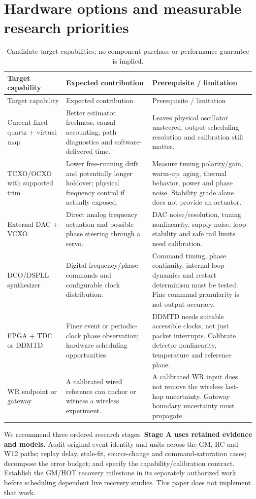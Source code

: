 \documentclass[11pt,letterpaper]{article}
\begin{document}
\section{Hardware options and measurable research priorities}
\small
\begin{longtable}{L{3.0cm}L{5.5cm}L{6.05cm}}
\caption{Candidate target capabilities; no component purchase or performance guarantee is implied.}\\
\toprule Target capability & Expected contribution & Prerequisite / limitation \\
\midrule\endfirsthead
\toprule Target capability & Expected contribution & Prerequisite / limitation \\
\midrule\endhead
Current fixed quartz + virtual map & Better estimator freshness, causal accounting, path diagnostics and software-delivered time. & Leaves physical oscillator unsteered; output scheduling resolution and calibration still matter. \\
TCXO/OCXO with supported trim & Lower free-running drift and potentially longer holdover; physical frequency control if actually exposed. & Measure tuning polarity/gain, warm-up, aging, thermal behavior, power and phase noise. Stability grade alone does not provide an actuator. \\
External DAC + VCXO & Direct analog frequency actuation and possible phase steering through a servo. & DAC noise/resolution, tuning nonlinearity, supply noise, loop stability and safe rail limits need calibration. \\
DCO/DSPLL synthesizer & Digital frequency/phase commands and configurable clock distribution. & Command timing, phase continuity, internal loop dynamics and restart determinism must be tested. Fine command granularity is not output accuracy. \\
FPGA + TDC or DDMTD & Finer event or periodic-clock phase observation; hardware scheduling opportunities. & DDMTD needs suitable accessible clocks, not just packet interrupts. Calibrate detector nonlinearity, temperature and reference plane. \\
WR endpoint or gateway & A calibrated wired reference can anchor or witness a wireless experiment. & A calibrated WR input does not remove the wireless last-hop uncertainty. Gateway boundary uncertainty must propagate. \\
\bottomrule
\end{longtable}
\normalsize

We recommend three ordered research stages. \textbf{Stage A uses retained evidence and models.} Audit original-event identity and units across the GM, RC and W12 paths; replay delay, stale-fit, source-change and command-saturation cases; decompose the error budget; and specify the capability/calibration contract. Establish the GM/HOT recovery milestone in its separately authorized work before scheduling dependent live recovery studies. This paper does not implement that work.
\end{document}
